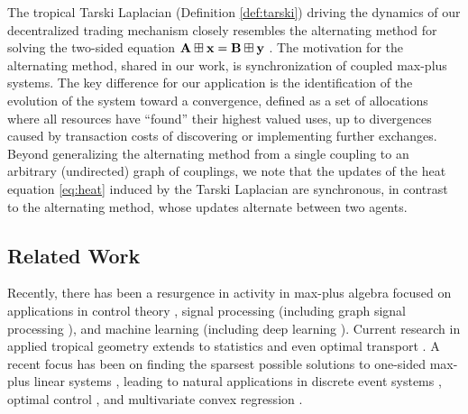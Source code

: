\documentclass[letterpaper, 10 pt, conference]{ieeeconf}
\begin{document}
The tropical Tarski Laplacian (Definition \ref{def:tarski}) driving the dynamics of our decentralized trading mechanism closely resembles the alternating method  for solving the two-sided equation $\mathbf{A} \boxplus \mathbf{x} = \mathbf{B} \boxplus \mathbf{y}$ \cite{cunninhamegreene2003}. The motivation for the alternating method, shared in our work, is synchronization of coupled max-plus systems. The key difference for our application is the identification of the evolution of the system toward a convergence, defined as a set of allocations where all resources have “found” their highest valued uses, up to divergences caused by transaction costs of discovering or implementing further exchanges.
Beyond generalizing the alternating method from a single coupling to an arbitrary (undirected) graph of couplings, we note that the updates of the heat equation \eqref{eq:heat} induced by the Tarski Laplacian are synchronous, in contrast to the alternating method, whose updates alternate between two agents.

\subsection{Related Work}
\label{sec:related}

Recently, there has been a resurgence in activity in max-plus algebra focused on applications in control theory \cite{maragos2017}, signal processing \cite{theodosis2018} (including graph signal processing \cite{blusseau2018}), and machine learning \cite{maragos2021} (including deep learning \cite{alfarra2022,zhang2019,tsilivis2022}). Current research in applied tropical geometry extends to statistics \cite{pachter2004} and even optimal transport \cite{lee2022}. A recent focus has been on finding the sparsest possible solutions to one-sided max-plus linear systems \cite{tsiamis2019,tsilivis2022}, leading to natural applications in discrete event systems \cite{tsiamis2019}, optimal control \cite{blusseau2018}, and multivariate convex regression \cite{tsilivis2021}.
\end{document}

